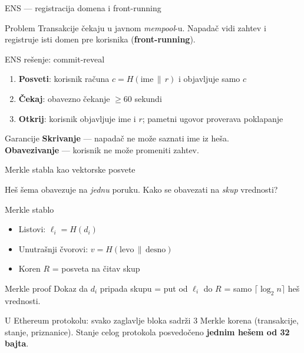 \documentclass[aspectratio=1610]{beamer}
\newcommand{\keyword}[1]{\textcolor{wcprimary}{\textbf{#1}}}
\begin{document}
\begin{frame}{ENS — registracija domena i front-running}
\begin{alertblock}{Problem}
  Transakcije čekaju u javnom \textit{mempool}-u.
  Napadač vidi zahtev i registruje isti domen pre korisnika (\keyword{front-running}).
\end{alertblock}

\begin{block}{ENS rešenje: commit-reveal}
  \begin{enumerate}
    
    \item \textbf{Posveti}: korisnik računa $c = H(\text{ime} \,\|\, r)$ i objavljuje samo $c$
    \item \textbf{Čekaj}: obavezno čekanje $\geq 60$ sekundi
    \item \textbf{Otkrij}: korisnik objavljuje ime i $r$; pametni ugovor proverava poklapanje
  \end{enumerate}
\end{block}

\begin{exampleblock}{Garancije}
  \keyword{Skrivanje} — napadač ne može saznati ime iz heša.\\
  \keyword{Obavezivanje} — korisnik ne može promeniti zahtev.
\end{exampleblock}
\end{frame}

\begin{frame}{Merkle stabla kao vektorske posvete}

Heš šema obavezuje na \emph{jednu} poruku. Kako se obavezati na \emph{skup} vrednosti?


\begin{block}{Merkle stablo}
  \begin{itemize}
    
    \item Listovi: $\ell_i = H(d_i)$
    \item Unutrašnji čvorovi: $v = H(\text{levo} \,\|\, \text{desno})$
    \item Koren $R$ = posveta na čitav skup
  \end{itemize}
\end{block}


\begin{exampleblock}{Merkle proof}
  Dokaz da $d_i$ pripada skupu = put od $\ell_i$ do $R$ = samo $\lceil\log_2 n\rceil$ heš vrednosti.
\end{exampleblock}


U Ethereum protokolu: svako zaglavlje bloka sadrži 3 Merkle korena
(transakcije, stanje, priznanice).
Stanje celog protokola posvedočeno \keyword{jednim hešem od 32 bajta}.
\end{frame}
\end{document}
